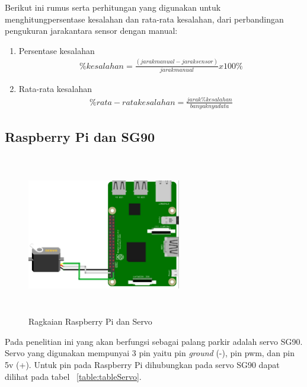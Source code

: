 Berikut ini rumus serta perhitungan yang digunakan untuk menghitungpersentase kesalahan dan rata-rata kesalahan, dari perbandingan pengukuran jarakantara sensor dengan manual:

\begin{enumerate}[topsep=0pt,itemsep=0pt,partopsep=0pt, parsep=0pt]
    \item Persentase kesalahan
    \begin{equation}
        \label{eq:persentase-kesalahan}
        \begin{split}
        \%kesalahan = \frac{(jarak manual - jarak sensor)}{jarak manual} x 100\%
        \end{split}
    \end{equation}

    \item Rata-rata kesalahan
    \begin{equation}
        \label{eq:persentase-kesalahan}
        \begin{split}
        \%rata-rata kesalahan = \frac{jarak \% kesalahan}{banyaknya data} 
        \end{split}
    \end{equation}
\end{enumerate}

\subsection{Raspberry Pi dan SG90}
\begin{figure} [H]
    \includegraphics[height=7cm, width=0.6\textwidth, center]{images/skematik_servo.jpg}
    \caption{Ragkaian Raspberry Pi dan Servo}
    \label{fig:skematikServo}
\end{figure}

Pada penelitian ini yang akan berfungsi sebagai palang parkir adalah servo SG90. Servo yang digunakan mempunyai 3 pin yaitu pin \textit{ground} (-), pin pwm, dan pin 5v (+). Untuk pin pada Raspberry Pi dihubungkan pada servo SG90 dapat dilihat pada tabel ~\ref{table:tableServo}.

